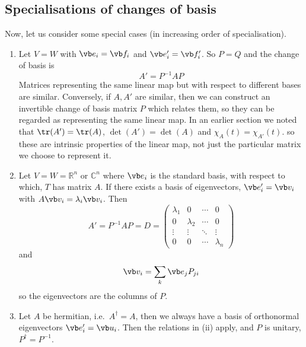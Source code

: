 \subsection{Specialisations of changes of basis}
Now, let us consider some special cases (in increasing order of specialisation).
\begin{enumerate}
	\item Let \(V=W\) with \(\vb e_i = \vb f_i\) and \(\vb e'_i = \vb f'_i\).
	      So \(P=Q\) and the change of basis is
	      \[
		      A' = P^{-1}AP
	      \]
	      Matrices representing the same linear map but with respect to different bases are similar.
	      Conversely, if \(A, A'\) are similar, then we can construct an invertible change of basis matrix \(P\) which relates them, so they can be regarded as representing the same linear map.
	      In an earlier section we noted that \(\tr(A') = \tr(A)\), \(\det(A') = \det(A)\) and \(\chi_A(t) = \chi_{A'}(t)\).
	      so these are intrinsic properties of the linear map, not just the particular matrix we choose to represent it.
	\item Let \(V=W=\mathbb R^n\) or \(\mathbb C^n\) where \(\vb e_i\) is the standard basis, with respect to which, \(T\) has matrix \(A\).
	      If there exists a basis of eigenvectors, \(\vb e'_i = \vb v_i\) with \(A\vb v_i = \lambda_i\vb v_i\).
	      Then
	      \[
		      A' = P^{-1}AP = D = \begin{pmatrix}
			      \lambda_1 & 0         & \cdots & 0         \\
			      0         & \lambda_2 & \cdots & 0         \\
			      \vdots    & \vdots    & \ddots & \vdots    \\
			      0         & 0         & \cdots & \lambda_n
		      \end{pmatrix}
	      \]
	      and
	      \[
		      \vb v_i = \sum_k \vb e_j P_{ji}
	      \]
	      so the eigenvectors are the columns of \(P\).
	\item Let \(A\) be hermitian, i.e.\ \(A^\dagger = A\), then we always have a basis of orthonormal eigenvectors \(\vb e'_i = \vb u_i\).
	      Then the relations in (ii) apply, and \(P\) is unitary, \(P^\dagger = P^{-1}\).
\end{enumerate}

